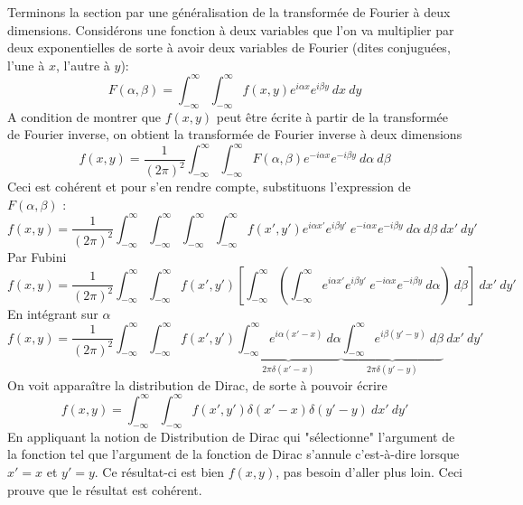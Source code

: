Terminons la section par une généralisation de la transformée de Fourier à deux dimensions. 
Considérons une fonction à deux variables que l'on va multiplier par deux exponentielles de 
sorte à avoir deux variables de Fourier (dites conjuguées, l'une à $x$, l'autre à $y$):
\begin{equation}
F(\alpha,\beta) = \int_{-\infty}^\infty\int_{-\infty}^\infty f(x,y)e^{i\alpha x}e^{i\beta y}\ 
dx\ dy
\end{equation}
A condition de montrer que $f(x,y)$ peut être écrite à partir de la transformée de Fourier 
inverse, on obtient la transformée de Fourier inverse à deux dimensions
\begin{equation}
f(x,y) = \frac{1}{(2\pi)^2} \int_{-\infty}^\infty\int_{-\infty}^\infty F(\alpha,\beta)
e^{-i\alpha x}e^{-i\beta y}\ d\alpha\ d\beta
\end{equation}
Ceci est cohérent et pour s'en rendre compte, substituons l'expression de $F(\alpha,\beta)$ :
\begin{equation}
f(x,y) = \frac{1}{(2\pi)^2} \int_{-\infty}^\infty\int_{-\infty}^\infty \int_{-\infty}^\infty
\int_{-\infty}^\infty f(x',y')e^{i\alpha x'}e^{i\beta y'}\ e^{-i\alpha x}e^{-i\beta y}\
 d\alpha\ d\beta\ dx'\ dy' 
\end{equation}
Par Fubini
\begin{equation}
f(x,y) = \frac{1}{(2\pi)^2} \int_{-\infty}^\infty\int_{-\infty}^\infty f(x',y') [\int_{-\infty}^\infty
(\int_{-\infty}^\infty e^{i\alpha x'}e^{i\beta y'}\ e^{-i\alpha x}e^{-i\beta y}\
 d\alpha)\ d\beta]\ dx'\ dy' 
\end{equation}
En intégrant sur $\alpha$
\begin{equation}
f(x,y) = \frac{1}{(2\pi)^2} \int_{-\infty}^\infty\int_{-\infty}^\infty f(x',y') \underbrace{
\int_{-\infty}^\infty e^{i\alpha(x'-x)}\ d\alpha}_{2\pi\delta(x'-x)} \underbrace{\int_{-\infty}^\infty 
e^{i\beta(y'-y)}\ d\beta}_{2\pi\delta(y'-y)}\ dx'\ dy'
\end{equation}
On voit apparaître la distribution de Dirac, de sorte à pouvoir écrire
\begin{equation}
f(x,y) = \int_{-\infty}^\infty\int_{-\infty}^\infty f(x',y')\delta(x'-x)\delta(y'-y)\ dx'\ dy'
\end{equation}
En appliquant la notion de Distribution de Dirac qui "sélectionne" l'argument de la fonction tel 
que l'argument de la fonction de Dirac s'annule c'est-à-dire lorsque $x'=x$ et $y'=y$. Ce résultat-ci 
est bien $f(x,y)$, pas besoin d'aller plus loin. Ceci prouve que le résultat est cohérent.





